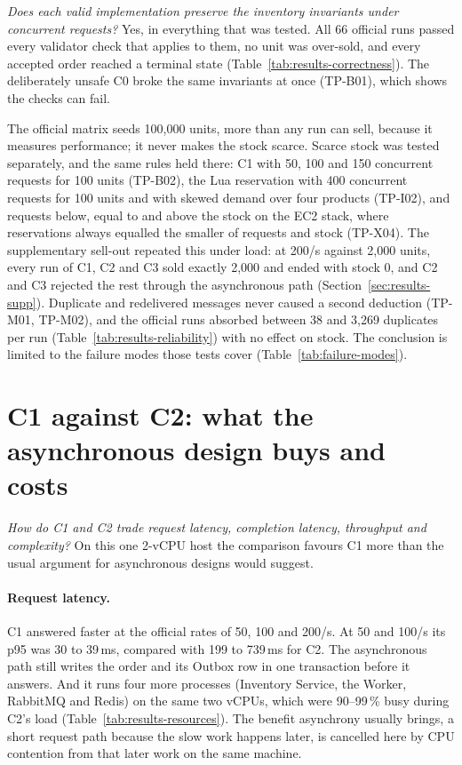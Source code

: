 \documentclass[a4paper]{report}
\begin{document}
\emph{Does each valid implementation preserve the inventory invariants under
concurrent requests?} Yes, in everything that was tested. All 66 official runs
passed every validator check that applies to them, no unit was over-sold, and
every accepted order reached a terminal state
(Table~\ref{tab:results-correctness}). The deliberately unsafe C0 broke the
same invariants at once (TP-B01), which shows the checks can fail.

The official matrix seeds 100,000 units, more than any run can sell, because
it measures performance; it never makes the stock scarce. Scarce stock was
tested separately, and the same rules held there: C1 with 50, 100 and 150
concurrent requests for 100 units (TP-B02), the Lua reservation with 400
concurrent requests for 100 units and with skewed demand over four products
(TP-I02), and requests below, equal to and above the stock on the EC2 stack,
where reservations always equalled the smaller of requests and stock
(TP-X04). The supplementary
sell-out repeated this under load: at 200/s against 2,000 units, every run of C1,
C2 and C3 sold exactly 2,000 and ended with stock 0, and C2 and C3 rejected the
rest through the asynchronous path (Section~\ref{sec:results-supp}). Duplicate and redelivered messages never caused a second deduction
(TP-M01, TP-M02), and the official runs absorbed between 38 and 3,269
duplicates per run (Table~\ref{tab:results-reliability}) with no effect on
stock. The conclusion is limited to the failure modes those tests cover
(Table~\ref{tab:failure-modes}).

\section{C1 against C2: what the asynchronous design buys and costs}

\emph{How do C1 and C2 trade request latency, completion latency, throughput
and complexity?} On this one 2-vCPU host the comparison favours C1 more than
the usual argument for asynchronous designs would suggest.

\paragraph{Request latency.} C1 answered faster at the official rates of
50, 100 and 200/s. At 50 and 100/s its p95 was 30 to 39\,ms, compared with
199 to 739\,ms for C2. The asynchronous path still writes the order and
its Outbox row in one transaction before it answers. And it runs four more
processes (Inventory Service, the Worker, RabbitMQ and Redis) on the same two
vCPUs, which were 90--99\,\% busy during C2's load
(Table~\ref{tab:results-resources}). The benefit asynchrony usually brings,
a short request path because the slow work happens later, is cancelled here by
CPU contention from that later work on the same machine.
\end{document}

